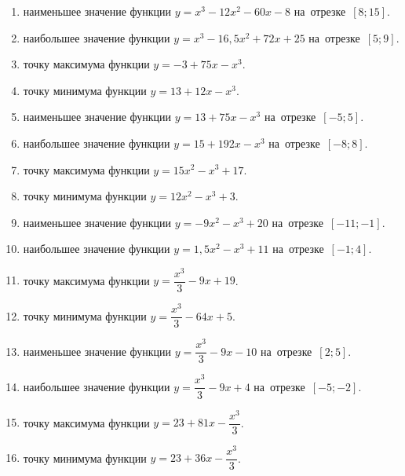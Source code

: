 \documentclass[a4paper,10pt]{article}
\begin{document}
\begin{enumerate}
\item {} наименьшее значение функции $y=x^3 -12x^2-60x-8$ на~отрезке~$\left[8;15\right]$.

\item {} наибольшее значение функции $y=x^3 -16,5x^2+72x+25$ на~отрезке~$\left[5;9\right]$.

\item {} точку максимума функции $y=-3+75x-x^3$.

\item {} точку минимума функции $y=13+12x-x^3$.

\item {} наименьшее значение функции $y=13+75x-x^3$ на~отрезке~$\left[-5;5\right]$.

\item {} наибольшее значение функции $y=15+192x-x^3$ на~отрезке~$\left[-8;8\right]$.

\item {} точку максимума функции $y=15x^2-x^3+17$.

\item {} точку минимума функции $y=12x^2-x^3+3$.

\item {} наименьшее значение функции $y=-9x^2-x^3+20$ на~отрезке~$\left[-11;-1\right]$.

\item {} наибольшее значение функции $y=1,5x^2-x^3+11$ на~отрезке~$\left[-1;4\right]$.

\item {} точку максимума функции $y=\dfrac{x^3}{3} -9x+19$.

\item {} точку минимума функции $y=\dfrac{x^3}{3} -64x+5$.

\item {} наименьшее значение функции $y=\dfrac{x^3}{3} -9x-10$ на~отрезке~$\left[2;5\right]$.

\item {} наибольшее значение функции $y=\dfrac{x^3}{3} -9x+4$ на~отрезке~$\left[-5;-2\right]$.

\item {} точку максимума функции $y=23 +81x-\dfrac{x^3}{3}$.

\item {} точку минимума функции $y=23 +36x-\dfrac{x^3}{3}$.


\end{enumerate}
\end{document}

